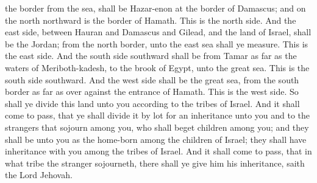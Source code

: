 the border from the sea, shall be Hazar-enon at the border of Damascus; and on the north northward is the border of Hamath. This is the north side. And the east side, between Hauran and Damascus and Gilead, and the land of Israel, shall be the Jordan; from the north border, unto the east sea shall ye measure. This is the east side. And the south side southward shall be from Tamar as far as the waters of Meriboth-kadesh, to the brook of Egypt, unto the great sea. This is the south side southward. And the west side shall be the great sea, from the south border as far as over against the entrance of Hamath. This is the west side.  So shall ye divide this land unto you according to the tribes of Israel. And it shall come to pass, that ye shall divide it by lot for an inheritance unto you and to the strangers that sojourn among you, who shall beget children among you; and they shall be unto you as the home-born among the children of Israel; they shall have inheritance with you among the tribes of Israel. And it shall come to pass, that in what tribe the stranger sojourneth, there shall ye give him his inheritance, saith the Lord Jehovah. 


